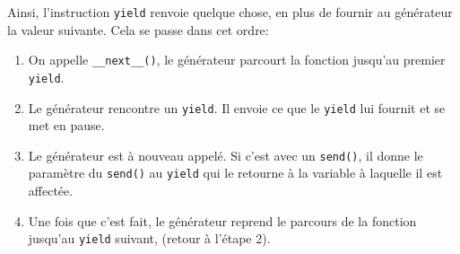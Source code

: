 \documentclass[a4paper, 10pt]{article}
\begin{document}
Ainsi, l'instruction \texttt{yield} renvoie quelque chose, en plus de fournir au générateur la valeur suivante. Cela se passe dans cet ordre:
\begin{enumerate}
    \item On appelle \texttt{__next__()}, le générateur parcourt la fonction jusqu'au premier \texttt{yield}.
    \item Le générateur rencontre un \texttt{yield}. Il envoie ce que le \texttt{yield} lui fournit et se met en pause.
    \item Le générateur est à nouveau appelé. Si c'est avec un \texttt{send()}, il donne le paramètre du \texttt{send()} au \texttt{yield} qui le retourne à la variable à laquelle il est affectée.
    \item Une fois que c'est fait, le générateur reprend le parcours de la fonction jusqu'au \texttt{yield} suivant, (retour à l'étape 2).
\end{enumerate}
\end{document}
